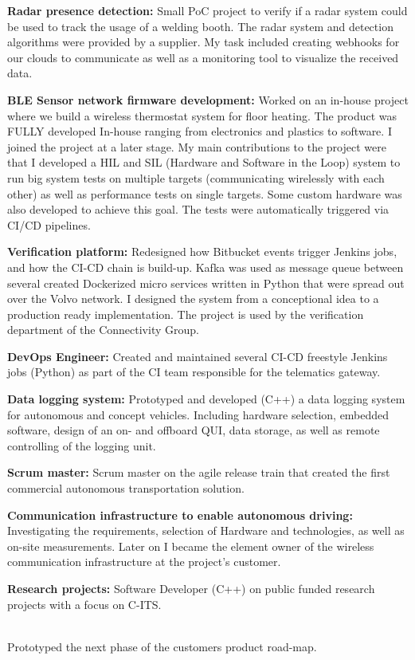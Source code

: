 \textbf{Radar presence detection:} Small PoC project to verify if a radar system could be used to track the usage of a welding booth. The radar system and detection algorithms were provided by a supplier. My task included creating webhooks for our clouds to communicate as well as a monitoring tool to visualize the received data. 
\SmallSep

\textbf{BLE Sensor network firmware development:} Worked on an in-house project where we build a wireless thermostat system for floor heating. The product was FULLY developed In-house ranging from electronics and plastics to software. I joined the project at a later stage. My main contributions to the project were that I developed a HIL and SIL (Hardware and Software in the Loop) system to run big system tests on multiple targets (communicating wirelessly with each other) as well as performance tests on single targets. Some custom hardware was also developed to achieve this goal. The tests were automatically triggered via CI/CD pipelines. \\ 
\Sep


\SmallSep
\textbf{Verification platform:} Redesigned how Bitbucket events trigger Jenkins jobs, and how the CI-CD chain is build-up. Kafka was used as message queue between several created Dockerized micro services written in Python that were spread out over the Volvo network. I designed the system from a conceptional idea to a production ready implementation. The project is used by the verification department of the Connectivity Group.
\SmallSep

\textbf{DevOps Engineer:} Created and maintained several CI-CD freestyle Jenkins jobs (Python) as part of the CI team responsible for the telematics gateway.
\SmallSep

\textbf{Data logging system:} Prototyped and developed (C++) a data logging system for autonomous and concept vehicles. Including hardware selection, embedded software, design of an on- and offboard QUI, data storage, as well as remote controlling of the logging unit. 
\SmallSep

\textbf{Scrum master:} Scrum master on the agile release train that created the first commercial autonomous transportation solution.
\SmallSep

\textbf{Communication infrastructure to enable autonomous driving:} Investigating the requirements, selection of Hardware and technologies, as well as on-site measurements. Later on I became the element owner of the wireless communication infrastructure at the project's customer.  
\SmallSep

\textbf{Research projects:} Software Developer (C++) on public funded research projects with a focus on C-ITS. \\
\Sep

 \\
Prototyped the next phase of the customers product road-map.
